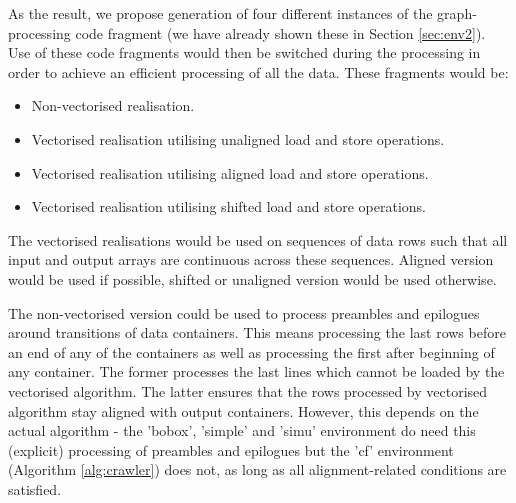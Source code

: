 As the result, we propose generation of four different instances of the graph-processing code fragment (we have already shown these in Section \ref{sec:env2}). Use of these code fragments would then be switched during the processing in order to achieve an efficient processing of all the data. These fragments would be:
\begin{itemize}
\item Non-vectorised realisation.
\item Vectorised realisation utilising unaligned load and store operations.
\item Vectorised realisation utilising aligned load and store operations.
\item Vectorised realisation utilising shifted load and store operations.
\end{itemize}

The vectorised realisations would be used on sequences of data rows such that all input and output arrays are continuous across these sequences. Aligned version would be used if possible, shifted or unaligned version would be used otherwise. 

The non-vectorised version could be used to process preambles and epilogues around transitions of data containers. This means processing the last  rows before an end of any of the containers as well as processing the first  after beginning of any container. The former processes the last  lines which cannot be loaded by the vectorised algorithm. The latter ensures that the rows processed by vectorised algorithm stay aligned with output containers. However, this depends on the actual algorithm - the 'bobox', 'simple' and 'simu' environment do need this (explicit) processing of preambles and epilogues but the 'cf' environment (Algorithm \ref{alg:crawler}) does not, as long as all alignment-related conditions are satisfied.


